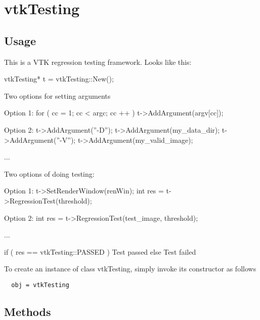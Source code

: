 \section{vtkTesting}

\subsection{Usage}


  This is a VTK regression testing framework. Looks like this:
 
  vtkTesting* t = vtkTesting::New();

  Two options for setting arguments
  
  Option 1:
  for ( cc = 1; cc < argc; cc ++ )
    {
    t->AddArgument(argv[cc]);
    }

  Option 2:
  t->AddArgument(''-D'');
  t->AddArgument(my\_data\_dir);
  t->AddArgument(''-V'');
  t->AddArgument(my\_valid\_image);

  ...
  
  Two options of doing testing:
  
  Option 1:
  t->SetRenderWindow(renWin);
  int res = t->RegressionTest(threshold);

  Option 2:
  int res = t->RegressionTest(test\_image, threshold);
  
  ...

  if ( res == vtkTesting::PASSED )
    {
    Test passed
    }
  else
    {
    Test failed
    }


To create an instance of class vtkTesting, simply
invoke its constructor as follows
\begin{verbatim}
  obj = vtkTesting
\end{verbatim}
\subsection{Methods}

